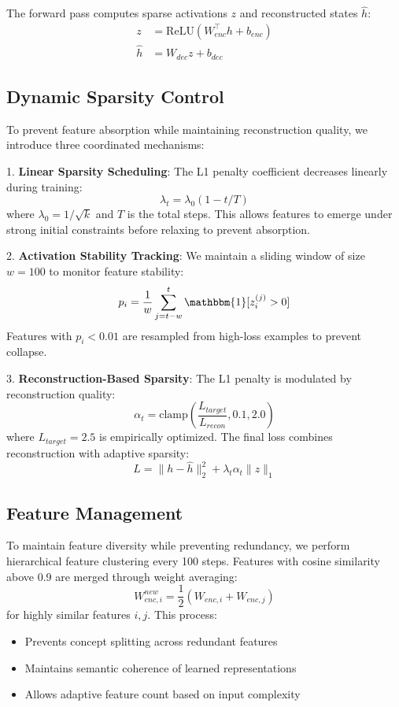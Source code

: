 \documentclass{article} %
\begin{document}
The forward pass computes sparse activations $z$ and reconstructed states $\hat{h}$:
\begin{align}
    z &= \text{ReLU}(W_{enc}^{\top} h + b_{enc}) \\
    \hat{h} &= W_{dec} z + b_{dec}
\end{align}

\subsection{Dynamic Sparsity Control}
To prevent feature absorption while maintaining reconstruction quality, we introduce three coordinated mechanisms:

1. \textbf{Linear Sparsity Scheduling}: The L1 penalty coefficient decreases linearly during training:
\begin{equation}
    \lambda_t = \lambda_0 (1 - t/T)
\end{equation}
where $\lambda_0 = 1/\sqrt{k}$ and $T$ is the total steps. This allows features to emerge under strong initial constraints before relaxing to prevent absorption.

2. \textbf{Activation Stability Tracking}: We maintain a sliding window of size $w=100$ to monitor feature stability:
\begin{equation}
    p_i = \frac{1}{w} \sum_{j=t-w}^t \mathbbm{1}[z_i^{(j)} > 0]
\end{equation}
Features with $p_i < 0.01$ are resampled from high-loss examples to prevent collapse.

3. \textbf{Reconstruction-Based Sparsity}: The L1 penalty is modulated by reconstruction quality:
\begin{equation}
    \alpha_t = \text{clamp}\left(\frac{L_{target}}{L_{recon}}, 0.1, 2.0\right)
\end{equation}
where $L_{target}=2.5$ is empirically optimized. The final loss combines reconstruction with adaptive sparsity:
\begin{equation}
    L = \|h - \hat{h}\|_2^2 + \lambda_t \alpha_t \|z\|_1
\end{equation}

\subsection{Feature Management}
To maintain feature diversity while preventing redundancy, we perform hierarchical feature clustering every 100 steps. Features with cosine similarity above 0.9 are merged through weight averaging:
\begin{equation}
    W_{enc,i}^{new} = \frac{1}{2}(W_{enc,i} + W_{enc,j})
\end{equation}
for highly similar features $i,j$. This process:
\begin{itemize}
    \item Prevents concept splitting across redundant features
    \item Maintains semantic coherence of learned representations  
    \item Allows adaptive feature count based on input complexity
\end{itemize}
\end{document}
